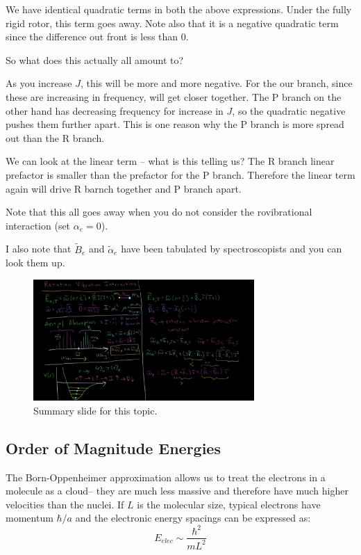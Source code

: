 \documentclass{article}
\begin{document}
We have identical quadratic terms in both the above expressions. Under the fully rigid rotor, this term goes away. Note also that it is a negative quadratic term since the difference out front is less than 0. 

So what does this actually all amount to?

As you increase $J$, this will be more and more negative. For the our branch, since these are increasing in frequency, will get closer together. The P branch on the other hand has decreasing frequency for increase in $J$, so the quadratic negative pushes them further apart. This is one reason why the P branch is more spread out than the R branch.

We can look at the linear term -- what is this telling us? The R branch linear prefactor is smaller than the prefactor for the P branch. Therefore the linear term again will drive R barnch together and P branch apart.

Note that this all goes away when you do not consider the rovibrational interaction (set $\alpha_e = 0$). 

I also note that $\tilde B_e$ and $\tilde \alpha_e$ have been tabulated by spectroscopists and you can look them up. 

\begin{figure}
    \centering
    \includegraphics[width=0.75\textwidth]{figures/Screen Shot 2020-09-27 at 6.44.40 PM.png}
    \caption{Summary slide for this topic. }
    \label{fig:summ}
\end{figure}

\subsection{Order of Magnitude Energies}
The Born-Oppenheimer approximation allows us to treat the electrons in a molecule as a cloud-- they are much less massive and therefore have much higher velocities than the nuclei. If $L$ is the molecular size, typical electrons have momentum $\hbar /a$ and the electronic energy spacings can be expressed as:
$$ E_{elec} \sim \frac{\hbar^2}{mL^2}$$
\end{document}
